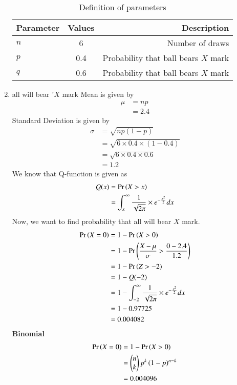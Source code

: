 \documentclass[journal,12pt,twocolumn]{IEEEtran}
\theoremstyle{remark}
\begin{document}
\begin{enumerate}
\begin{table}[!ht]
\centering
\begin{tabular}{|l|c|r|}
    \hline
    Parameter & Values & Description\\
    \hline
    $n$ & 6 & Number of draws\\
    \hline
    $p$ & 0.4 & Probability that ball bears $X$ mark \\
    \hline
    $q$ & 0.6 & Probability that ball bears $X$ mark \\
    \hline
\end{tabular}
\caption{Definition of parameters}
\label{tab:gaussian/9/3/17}
\end{table}
\item all will bear '$X$ mark
Mean is given by
\begin{align}
	\mu &= np \\
	&= 2.4
\end{align}
Standard Deviation is given by
\begin{align}
	\sigma &= \sqrt{np(1 - p)}\\
	&= \sqrt{6 \times 0.4 \times (1 - 0.4)} \\
	&= \sqrt{6 \times 0.4 \times 0.6}\\
	&=  1.2
\end{align}
We know that Q-function is given as
\begin{align}
Q(x) &= \Pr\left(X > x\right)\\
&= \int_{x}^{\infty}\frac{1}{\sqrt{2\pi}}\times e^{-\frac{x^2}{2}}dx
\end{align}
Now, we want to find probability that all will bear $X$ mark.
\begin{align}
\Pr\left(X = 0\right) &=1-\Pr\left(X > 0\right) \\
&=1-\Pr\left(\frac{X - \mu}{\sigma} > \frac{0 - 2.4}{1.2}\right) \\
&= 1-\Pr\left(Z > -2\right) \\
&= 1- Q(-2)\\
&= 1- \int_{-2}^{\infty}\frac{1}{\sqrt{2\pi}}\times e^{-\frac{x^2}{2}}dx\\
&= 1-0.97725\\
&=0.004082
\end{align}
\textbf{Binomial}
\begin{align}
\Pr\left(X =0\right) &= 1 - \Pr\left(X> 0\right) \\
&= \begin{pmatrix}n\\k\end{pmatrix}p^k\left(1-p\right)^{n-k} \\
&= 0.004096
\end{align}

\end{enumerate}
\end{document}
